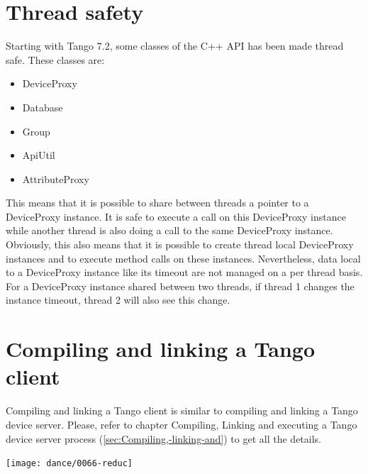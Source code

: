 \section{Thread safety}

Starting with Tango 7.2, some classes of the C++ API has been made
thread safe. These classes are:
\begin{itemize}
\item DeviceProxy
\item Database
\item Group
\item ApiUtil
\item AttributeProxy
\end{itemize}
This means that it is possible to share between threads a pointer
to a DeviceProxy instance. It is safe to execute a call on this DeviceProxy
instance while another thread is also doing a call to the same DeviceProxy
instance. Obviously, this also means that it is possible to create
thread local DeviceProxy instances and to execute method calls on
these instances. Nevertheless, data local to a DeviceProxy instance
like its timeout are not managed on a per thread basis. For a DeviceProxy
instance shared between two threads, if thread 1 changes the instance
timeout, thread 2 will also see this change.


\section{Compiling and linking a Tango client}

Compiling and linking a Tango client is similar to compiling and linking
a Tango device server. Please, refer to chapter \textquotedbl{}Compiling,
Linking and executing a Tango device server process\textquotedbl{}
(\ref{sec:Compiling,-linking-and}) to get all the details.

\begin{center}

\label{ThreeRicardo}\texttt{[image: dance/0066-reduc]}

\end{center}
